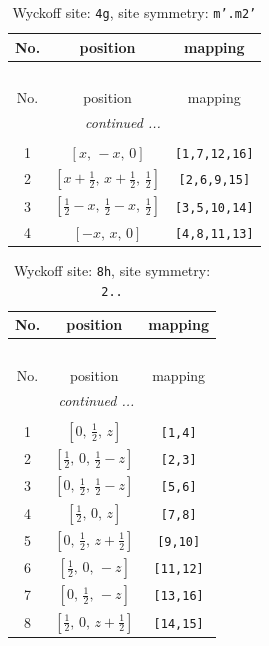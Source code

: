 \documentclass[fleqn,8pt]{jsarticle}
\begin{document}
\renewcommand{\arraystretch}{1.2}
\begin{longtable}{ccc}
\caption{Wyckoff site: {\tt 4g}, site symmetry: {\tt m'.m2'}}
 \\
 \hline \hline
No. & position & mapping \\ \hline \endfirsthead

\multicolumn{2}{l}{\tablename\ \thetable{}} \\
 \hline \hline
No. & position & mapping \\ \hline \endhead

 \hline \hline
\multicolumn{2}{r}{\footnotesize\it continued ...} \\ \endfoot

 \hline \hline
\multicolumn{2}{r}{} \\ \endlastfoot

1 & $\left[ x,\, - x,\, 0 \right]$ & {\tt [1,7,12,16]} \\ \hline
2 & $\left[ x + \frac{1}{2},\, x + \frac{1}{2},\, \frac{1}{2} \right]$ & {\tt [2,6,9,15]} \\ \hline
3 & $\left[ \frac{1}{2} - x,\, \frac{1}{2} - x,\, \frac{1}{2} \right]$ & {\tt [3,5,10,14]} \\ \hline
4 & $\left[ - x,\, x,\, 0 \right]$ & {\tt [4,8,11,13]} \\
\end{longtable}
\renewcommand{\arraystretch}{1.2}
\begin{longtable}{ccc}
\caption{Wyckoff site: {\tt 8h}, site symmetry: {\tt 2..}}
 \\
 \hline \hline
No. & position & mapping \\ \hline \endfirsthead

\multicolumn{2}{l}{\tablename\ \thetable{}} \\
 \hline \hline
No. & position & mapping \\ \hline \endhead

 \hline \hline
\multicolumn{2}{r}{\footnotesize\it continued ...} \\ \endfoot

 \hline \hline
\multicolumn{2}{r}{} \\ \endlastfoot

1 & $\left[ 0,\, \frac{1}{2},\, z \right]$ & {\tt [1,4]} \\ \hline
2 & $\left[ \frac{1}{2},\, 0,\, \frac{1}{2} - z \right]$ & {\tt [2,3]} \\ \hline
3 & $\left[ 0,\, \frac{1}{2},\, \frac{1}{2} - z \right]$ & {\tt [5,6]} \\ \hline
4 & $\left[ \frac{1}{2},\, 0,\, z \right]$ & {\tt [7,8]} \\ \hline
5 & $\left[ 0,\, \frac{1}{2},\, z + \frac{1}{2} \right]$ & {\tt [9,10]} \\ \hline
6 & $\left[ \frac{1}{2},\, 0,\, - z \right]$ & {\tt [11,12]} \\ \hline
7 & $\left[ 0,\, \frac{1}{2},\, - z \right]$ & {\tt [13,16]} \\ \hline
8 & $\left[ \frac{1}{2},\, 0,\, z + \frac{1}{2} \right]$ & {\tt [14,15]} \\
\end{longtable}
\end{document}

